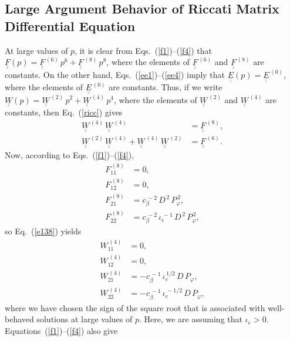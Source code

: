 \documentclass[12pt,prb,aps]{revtex4-1}
\begin{document}
\subsection{Large Argument Behavior of Riccati Matrix Differential Equation}
At large values of $p$, it is clear from Eqs.~(\ref{f1})--(\ref{f4}) that  $\underline{\underline{F}}(p)=\underline{\underline{F}}^{\,(6)}\,p^6+ 
\underline{\underline{F}}^{\,(8)}\,p^8$, where the elements of $\underline{\underline{F}}^{\,(6)}$ and $\underline{\underline{F}}^{\,(8)}$ are constants.
On the other hand, Eqs.~(\ref{ee1})--(\ref{ee4}) imply that $\underline{\underline{E}}(p)=\underline{\underline{E}}^{\,(0)}$, 
where the elements of $\underline{\underline{E}}^{\,(0)}$ are constants. 
Thus, if we write $\underline{\underline{W}}(p) =\underline{\underline{W}}^{\,(2)}\,p^2+\underline{\underline{W}}^{\,(4)}\,p^4$,
where the elements of $\underline{\underline{W}}^{\,(2)}$ and  $\underline{\underline{W}}^{\,(4)}$ are constants, then Eq.~(\ref{ricc}) gives 
\begin{align}\label{e138}
\underline{\underline{W}}^{\,(4)}\,\underline{\underline{W}}^{\,(4)}&= \underline{\underline{F}}^{\,(8)},\\[0.5ex]
\underline{\underline{W}}^{\,(2)}\,\underline{\underline{W}}^{\,(4)}+ \underline{\underline{W}}^{\,(4)}\,\underline{\underline{W}}^{\,(2)}&= 
\underline{\underline{F}}^{\,(6)}.\label{e139}
\end{align}
Now, according to Eqs.~(\ref{f1})--(\ref{f4}), 
\begin{align}
F^{\,(8)}_{11} &=0,\\[0.5ex]
F^{\,(8)}_{12} &= 0,\\[0.5ex]
F^{\,(8)}_{21} &= c_\beta^{\,-2}\,D^{\,2}\,P_\varphi^{\,2},\\[0.5ex]
F^{\,(8)}_{22} &= c_\beta^{\,-2}\,\iota_e^{\,-1}\,D^{\,2}\,P_\varphi^{\,2},
\end{align}
so Eq.~(\ref{e138}) yields 
\begin{align}
W^{\,(4)}_{11} &=0,\\[0.5ex]
W^{\,(4)}_{12} &= 0,\\[0.5ex]
W^{\,(4)}_{21} &= -c_\beta^{\,-1}\,\iota_e^{\,1/2}\,D\,P_\varphi,\\[0.5ex]
W^{\,(4)}_{22} &=-c_\beta^{\,-1}\,\iota_e^{\,-1/2}\, D\,P_\varphi,
\end{align}
where we have chosen the sign of the square root that is associated with well-behaved solutions at large values of $p$. Here, we are  assuming that $\iota_e>0$. 
Equations~(\ref{f1})--(\ref{f4}) also give 
\end{document}

